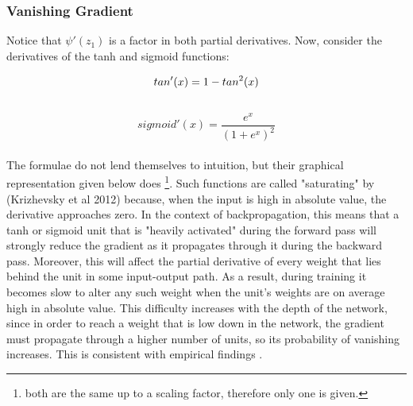 \documentclass[a4paper,11pt]{article}
\begin{document}
\subsubsection{Vanishing Gradient}

Notice that $\psi'(z_1)$ is a factor in both partial derivatives. Now, consider the derivatives of the tanh and sigmoid functions: 

\begin{equation}
tan'(x) = 1 - tan^2(x)  \\
\end{equation} \\
\begin{equation}
sigmoid'(x) = \frac{e^x}{(1 + e^x)^2}
\end{equation} \\

The formulae do not lend themselves to intuition, but their graphical representation given below does \footnote{both are the same up to a scaling factor, therefore only one is given.}. Such functions are called "saturating" by (Krizhevsky et al 2012) because, when the input is high in absolute value, the derivative approaches zero. In the context of backpropagation, this means that a tanh or sigmoid unit that is "heavily activated" during the forward pass will strongly reduce the gradient as it propagates through it during the backward pass. Moreover, this will affect the partial derivative of every weight that lies behind the unit in some input-output path. As a result, during training it becomes slow to alter any such weight when the unit's weights are on average high in absolute value. This difficulty increases with the depth of the network, since in order to reach a weight that is low down in the network, the gradient must propagate through a higher number of units, so its probability of vanishing increases. This is consistent with empirical findings \cite{DL-book}. \\
\end{document}
